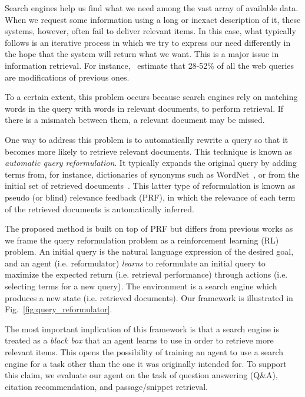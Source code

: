 \documentclass[11pt,letterpaper]{article}
\begin{document}
Search engines help us find what we need among the vast array of available data. When we request some information using a long or inexact description of it, these systems, however, often fail to deliver relevant items. In this case, what typically follows is an iterative process in which we try to express our need differently in the hope that the system will return what we want. This is a major issue in information retrieval. For instance,~\citet{huang2009analyzing} estimate that 28-52\% of all the web queries are modifications of previous ones.

To a certain extent, this problem occurs because search engines rely on matching words in the query with words in relevant documents, to perform retrieval. If there is a mismatch between them, a relevant document may be missed.


One way to address this problem is to automatically rewrite a query so that it becomes more likely to retrieve relevant documents. This technique is known as \textit{automatic query reformulation}. It typically expands the original query by adding terms from, for instance, dictionaries of synonyms such as WordNet~\cite{miller1995wordnet}, or from the initial set of retrieved documents~\cite{xu1996query}. This latter type of reformulation is known as pseudo (or blind) relevance feedback (PRF), in which the relevance of each term of the retrieved documents is automatically inferred.

The proposed method is built on top of PRF but differs from previous works as we frame the query reformulation problem as a reinforcement learning (RL) problem. An initial query is the natural language expression of the desired goal, and an agent (i.e. reformulator) \textit{learns} to reformulate an initial query to maximize the expected return (i.e. retrieval performance) through actions (i.e. selecting terms for a new query). The environment is a search engine which produces a new state (i.e. retrieved documents). Our framework is illustrated in Fig.~\ref{fig:query_reformulator}.

The most important implication of this framework is that a search engine is treated as a \textit{black box} that an agent learns to use in order to retrieve more relevant items. This opens the possibility of training an agent to use a search engine for a task other than the one it was originally intended for. To support this claim, we evaluate our agent on the task of question answering (Q\&A), citation recommendation, and passage/snippet retrieval.
\end{document}
